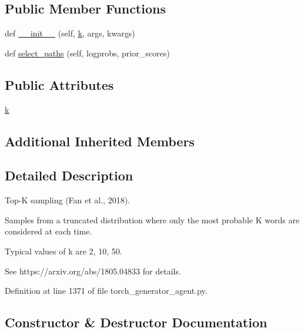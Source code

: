 \subsection*{Public Member Functions}
\begin{DoxyCompactItemize}
\item 
def \hyperlink{classparlai_1_1core_1_1torch__generator__agent_1_1TopKSampling_aa45e1c1fe90c563bf8057969417545e4}{\+\_\+\+\_\+init\+\_\+\+\_\+} (self, \hyperlink{classparlai_1_1core_1_1torch__generator__agent_1_1TopKSampling_a69d2f8e711e51151aa6649a4889e8243}{k}, args, kwargs)
\item 
def \hyperlink{classparlai_1_1core_1_1torch__generator__agent_1_1TopKSampling_a3ca83b8ee8aff13c05afbb973f948b6f}{select\+\_\+paths} (self, logprobs, prior\+\_\+scores)
\end{DoxyCompactItemize}
\subsection*{Public Attributes}
\begin{DoxyCompactItemize}
\item 
\hyperlink{classparlai_1_1core_1_1torch__generator__agent_1_1TopKSampling_a69d2f8e711e51151aa6649a4889e8243}{k}
\end{DoxyCompactItemize}
\subsection*{Additional Inherited Members}


\subsection{Detailed Description}
\begin{DoxyVerb}Top-K sampling (Fan et al., 2018).

Samples from a truncated distribution where only the most probable K words
are considered at each time.

Typical values of k are 2, 10, 50.

See https://arxiv.org/abs/1805.04833 for details.
\end{DoxyVerb}
 

Definition at line 1371 of file torch\+\_\+generator\+\_\+agent.\+py.



\subsection{Constructor \& Destructor Documentation}
\mbox{\label{classparlai_1_1core_1_1torch__generator__agent_1_1TopKSampling_aa45e1c1fe90c563bf8057969417545e4}} 
